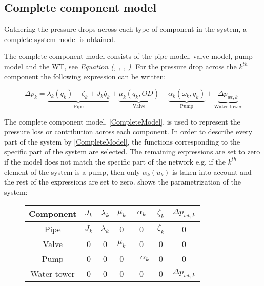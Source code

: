 \subsection{Complete component model}
\label{CompleteSystemModel}
Gathering the pressure drops across each type of component in the system, a complete system model is obtained.

The complete component model consists of the pipe model, valve model, pump model and the WT, see \textit{Equation (, , , )}. For the pressure drop across the $k^{th}$ component the following expression can be written: 

%

\begin{equation}
\label{CompleteModel}
\Delta p_k = \underbrace{\lambda_k (q_k) + \zeta_k + J_k \dot{q_k}}_\text{Pipe} + \underbrace{\mu_k (q_k, OD)}_\text{Valve} - \underbrace{\alpha_k(\omega_k,q_k)}_\text{Pump} + \underbrace{\Delta p_{wt,k}}_\text{Water tower}
\end{equation}

The complete component model, \eqref{CompleteModel}, is used to represent the pressure loss or contribution across each component. In order to describe every part of the system by \eqref{CompleteModel}, the functions corresponding to the specific part of the system are selected. The remaining expressions are set to zero if the model does not match the specific part of the network e.g. if the $k^{th}$ element of the system is a pump, then only $\alpha_k(u_k)$ is taken into account and the rest of the expressions are set to zero. 
 shows the parametrization of the system: 

\begin{figure}[H]
	\centering
\begin{tabular}{c|cccccc} 
		\bfseries Component    &     $J_k$  &$\lambda_k$    &    $\mu_k$    &   $\alpha_k$   &  $\zeta_k$   &  $\Delta p_{wt,k}$ \\\hline
		Pipe			  	   &     $J_k$  &$\lambda_k$    &    0          &   0            &  $\zeta_k$   &  0	    			\\ 
		Valve       	       &     0      &0              &    $\mu_k$    &   0 		     &  0    		&  0					\\ 
		Pump 		    	   &     0      &0              &    0          &   $-\alpha_k$   &  0    		&  0	    			\\
		Water tower 	   	   &     0      &0              &    0          &   0            &  0    		&  $\Delta p_{wt,k}$	
\end{tabular}
		\label{tab:parametrization_model}

\end{figure}	

